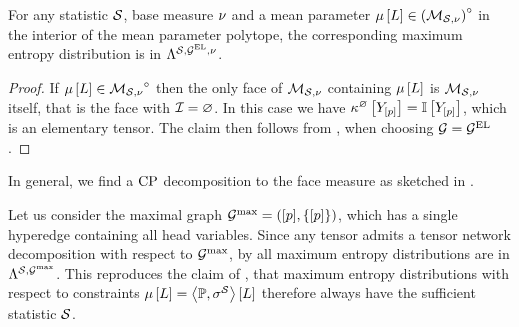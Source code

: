 \begin{theorem}
    For any statistic $\mathcal{S}$, base measure $\nu$ and a mean parameter $\mu\left[L\right]\in{\left(\mathcal{M}_{\mathcal{S},\nu}\right)}^{\circ}$ in the interior of the mean parameter polytope, the corresponding maximum entropy distribution is in $\Lambda^{\mathcal{S},\mathcal{G}^{\mathrm{EL}},\nu}$.
\end{theorem}
\begin{proof}
    If $\mu\left[L\right]\in{\mathcal{M}_{\mathcal{S},\nu}}^{\circ}$ then the only face of $\mathcal{M}_{\mathcal{S},\nu}$ containing $\mu\left[L\right]$ is $\mathcal{M}_{\mathcal{S},\nu}$ itself, that is the face with $\mathcal{I}=\varnothing$.
    In this case we have $\kappa^{\varnothing}\left[Y_{[p]}\right]=\mathbb{I}\left[Y_{[p]}\right]$, which is an elementary tensor.
    The claim then follows from , when choosing $\mathcal{G}=\mathcal{G}^{\mathrm{EL}}$.
\end{proof}

In general, we find a $\mathrm{CP}$ decomposition to the face measure as sketched in .



\begin{example}
    Let us consider the maximal graph $\mathcal{G}^{\mathrm{max}}=([p],\{[p]\})$, which has a single hyperedge containing all head variables.
    Since any tensor admits a tensor network decomposition with respect to $\mathcal{G}^{\mathrm{max}}$, by  all maximum entropy distributions are in $\Lambda^{\mathcal{S},\mathcal{G}^{\mathrm{max}}}$.
    This reproduces the claim of , that maximum entropy distributions with respect to constraints $\mu\left[L\right]=\left\langle \mathbb{P},\sigma^{\mathcal{S}}\right\rangle \left[ L \right]$ therefore always have the sufficient statistic $\mathcal{S}$.
\end{example}

